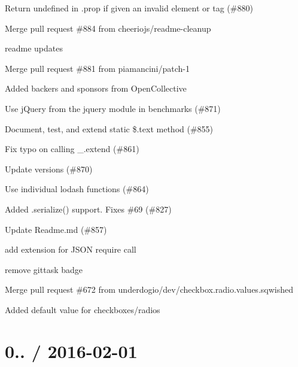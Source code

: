 
\begin{DoxyItemize}
\item Return undefined in .prop if given an invalid element or tag (\#880)
\item Merge pull request \#884 from cheeriojs/readme-\/cleanup
\item readme updates
\item Merge pull request \#881 from piamancini/patch-\/1
\item Added backers and sponsors from Open\+Collective
\item Use j\+Query from the jquery module in benchmarks (\#871)
\item Document, test, and extend static {\ttfamily \$.text} method (\#855)
\item Fix typo on calling \+\_\+.\+extend (\#861)
\item Update versions (\#870)
\item Use individual lodash functions (\#864)
\item Added {\ttfamily .serialize()} support. Fixes \#69 (\#827)
\item Update Readme.\+md (\#857)
\item add extension for J\+S\+ON require call
\item remove gittask badge
\item Merge pull request \#672 from underdogio/dev/checkbox.\+radio.\+values.\+sqwished
\item Added default value for checkboxes/radios
\end{DoxyItemize}

\section*{0.. / 2016-\/02-\/01 }


